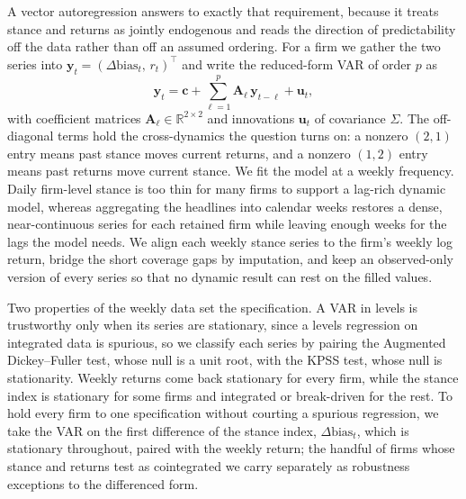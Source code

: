 \documentclass[conference]{IEEEtran}
\newcommand{\R}{\mathbb{R}}
\begin{document}
A vector autoregression answers to exactly that requirement, because it treats
stance and returns as jointly endogenous and reads the direction of predictability
off the data rather than off an assumed ordering. For a firm we gather the two
series into $\mathbf{y}_t = (\Delta\text{bias}_t,\, r_t)^{\top}$ and write the
reduced-form VAR of order $p$ as
\begin{equation}
\mathbf{y}_t = \mathbf{c} + \sum_{\ell=1}^{p}\mathbf{A}_\ell\,\mathbf{y}_{t-\ell}
+ \mathbf{u}_t,
\label{eq:var}
\end{equation}
with coefficient matrices $\mathbf{A}_\ell \in \R^{2\times2}$ and innovations
$\mathbf{u}_t$ of covariance $\Sigma$. The off-diagonal terms hold the cross-dynamics
the question turns on: a nonzero $(2,1)$ entry means past stance moves current
returns, and a nonzero $(1,2)$ entry means past returns move current stance. We fit
the model at a weekly frequency. Daily firm-level stance is too thin for many firms
to support a lag-rich dynamic model, whereas aggregating the headlines into calendar
weeks restores a dense, near-continuous series for each retained firm while leaving
enough weeks for the lags the model needs. We align each weekly stance series to the
firm's weekly log return, bridge the short coverage gaps by imputation, and keep an
observed-only version of every series so that no dynamic result can rest on the
filled values.

Two properties of the weekly data set the specification. A VAR in levels is
trustworthy only when its series are stationary, since a levels regression on
integrated data is spurious, so we classify each series by pairing the Augmented
Dickey--Fuller test, whose null is a unit root, with the KPSS test, whose null is
stationarity. Weekly returns come back stationary for every firm, while the stance
index is stationary for some firms and integrated or break-driven for the rest. To
hold every firm to one specification without courting a spurious regression, we take
the VAR on the first difference of the stance index, $\Delta\text{bias}_t$, which is
stationary throughout, paired with the weekly return; the handful of firms whose
stance and returns test as cointegrated we carry separately as robustness exceptions
to the differenced form.
\end{document}
